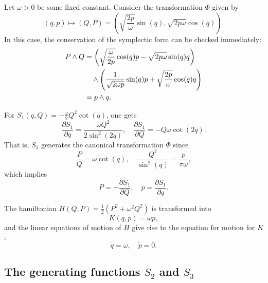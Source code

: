 \documentclass[english,fontsize=11pt,paper=a5,oneside]{scrbook}
\let\d\relax
\DeclareMathOperator{\d}{d}
\theoremstyle{definition}
\newenvironment{example}
  {\pushQED{\qed}\renewcommand{\qedsymbol}{$\lozenge$}\examplex}
  {\popQED\endexamplex}
\begin{document}
\begin{example}\label{ex:integrabilityho}
    Let $\omega > 0$ be some fixed constant.
    Consider the transformation $\Phi$ given by
    \begin{equation}
        (q,p) \mapsto (Q,P) = \left(
            \sqrt{\frac{2p}{\omega}} \sin(q),
            \sqrt{2p\omega}\cos(q)
            \right).
    \end{equation}
    In this case, the conservation of the symplectic form can be checked immediately:
    \begin{align}
        \d P\wedge \d Q &=
          \left(\sqrt{\frac{\omega}{2 p}}\cos(q)\d p - \sqrt{2 p\omega} \sin(q)\d q\right) \\
        &\quad\wedge
          \left(\frac{1}{\sqrt{2\omega p}}\sin(q)\d p + \sqrt{\frac{2 p}{\omega}} \cos(q)\d q\right) \\
        & = \d p \wedge \d q.
    \end{align}

    For $S_1(q,Q) = -\frac{\omega}{2}Q^2\cot(q)$, one gets
    \begin{equation}
        \frac{\partial S_1}{\partial q} = \frac{\omega Q^2}{2\sin^2(2q)}, \quad
        \frac{\partial S_1}{\partial Q} = - Q\omega \cot(2q).
    \end{equation}
    That is, $S_1$ generates the canonical transformation $\Phi$ since
    \begin{equation}
        \frac{P}{Q} = \omega\cot(q), \quad
        \frac{Q^2}{\sin^2(q)} = \frac{p}{\pi\omega},
    \end{equation}
    which implies
    \begin{equation}
        P = -\frac{\partial S_1}{\partial Q}, \quad
        p = \frac{\partial S_1}{\partial q}.
    \end{equation}

    The hamiltonian $H(Q,P) = \frac12 (P^2 + \omega^2 Q^2)$ is transformed into
    \begin{equation}
        K(q,p) = \omega p,
    \end{equation}
    and the linear equations of motion of $H$ give rise to the equation for motion for $K$:
    \begin{equation}
        \dot q = \omega, \quad \dot p = 0.
    \end{equation}
\end{example}

\subsection{The generating functions $S_2$ and $S_3$}
\end{document}
